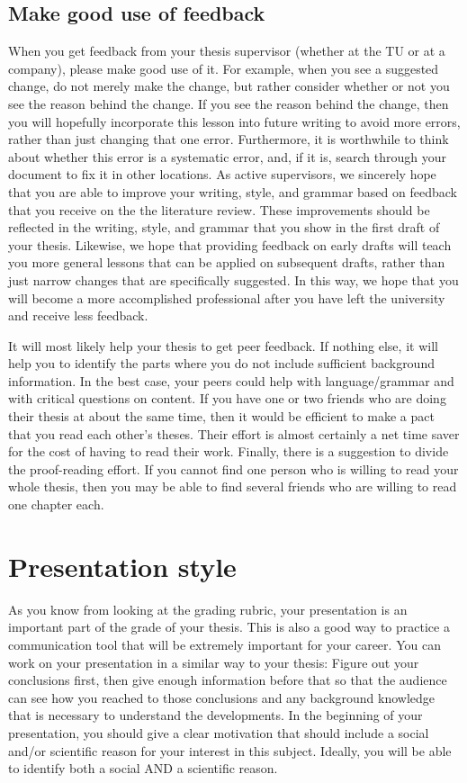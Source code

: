 \documentclass{article}
\begin{document}
\subsection{Make good use of feedback}
When you get feedback from your thesis supervisor (whether at the TU or at a company), please make good use of it. For example, when you see a suggested change, do not merely make the change, but rather consider whether or not you see the reason behind the change. If you see the reason behind the change, then you will hopefully incorporate this lesson into future writing to avoid more errors, rather than just changing that one error. Furthermore, it is worthwhile to think about whether this error is a systematic error, and, if it is, search through your document to fix it in other locations. As active supervisors, we sincerely hope that you are able to improve your writing, style, and grammar based on feedback that you receive on the the literature review. These improvements should be reflected in the writing, style, and grammar that you show in the first draft of your thesis. Likewise, we hope that providing feedback on early drafts will teach you more general lessons that can be applied on subsequent drafts, rather than just narrow changes that are specifically suggested. In this way, we hope that you will become a more accomplished professional after you have left the university and receive less feedback.

It will most likely help your thesis to get peer feedback. If nothing else, it will help you to identify the parts where you do not include sufficient background information. In the best case, your peers could help with language/grammar and with critical questions on content. If you have one or two friends who are doing their thesis at about the same time, then it would be efficient to make a pact that you read each other’s theses. Their effort is almost certainly a net time saver for the cost of having to read their work. Finally, there is a suggestion to divide the proof-reading effort. If you cannot find one person who is willing to read your whole thesis, then you may be able to find several friends who are willing to read one chapter each.


\section{Presentation style}
As you know from looking at the grading rubric, your presentation is an important part of the grade of your thesis. This is also a good way to practice a communication tool that will be extremely important for your career. You can work on your presentation in a similar way to your thesis: Figure out your conclusions first, then give enough information before that so that the audience can see how you reached to those conclusions and any background knowledge that is necessary to understand the developments. In the beginning of your presentation, you should give a clear motivation that should include a social and/or scientific reason for your interest in this subject. Ideally, you will be able to identify both a social AND a scientific reason.
\end{document}
